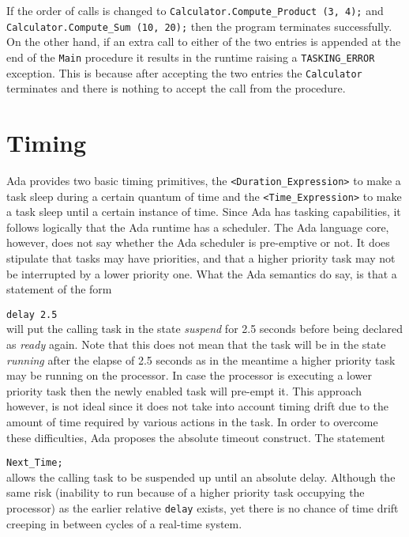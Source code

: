 If the order of calls is changed to
\texttt{Calculator.Compute\_Product (3, 4);} and
\texttt{Calculator.Compute\_Sum (10, 20);} then the program terminates
successfully. On the other hand, if an extra call to either of the two
entries is appended at the end of the \texttt{Main} procedure it
results in the runtime raising a \texttt{TASKING\_ERROR}
exception. This is because after accepting the two entries the
\texttt{Calculator} terminates and there is nothing to accept the call
from the procedure.

\section{Timing}
\label{ada_tasking_timing}
Ada provides two basic timing primitives, the 
\texttt{<Duration\_Expression>} to make a task sleep during a certain
quantum of time and the  \texttt{<Time\_Expression>}
to make a task sleep until a certain instance of time. Since Ada has
tasking capabilities, it follows logically that the Ada runtime has a
scheduler. The Ada language core, however, does not say whether the
Ada scheduler is pre-emptive or not. It does stipulate that tasks may
have priorities, and that a higher priority task may not be
interrupted by a lower priority one. What the Ada semantics do say, is
that a statement of the form

\texttt{delay 2.5}\\will put the calling task in the state
\emph{suspend} for 2.5 seconds before being declared as \emph{ready}
again. Note that this does not mean that the task will be in the state
\emph{running} after the elapse of 2.5 seconds as in the meantime a
higher priority task may be running on the processor. In case the
processor is executing a lower priority task then the newly enabled
task will pre-empt it. This approach however, is not ideal since it
does not take into account timing drift due to the amount of time
required by various actions in the task. In order to overcome these
difficulties, Ada proposes the absolute timeout construct. The
statement

 \texttt{Next\_Time;}\\ allows the calling task to be
suspended up until an absolute delay. Although the same risk
(inability to run because of a higher priority task occupying the
processor) as the earlier relative \texttt{delay} exists, yet there is
no chance of time drift creeping in between cycles of a real-time
system.


